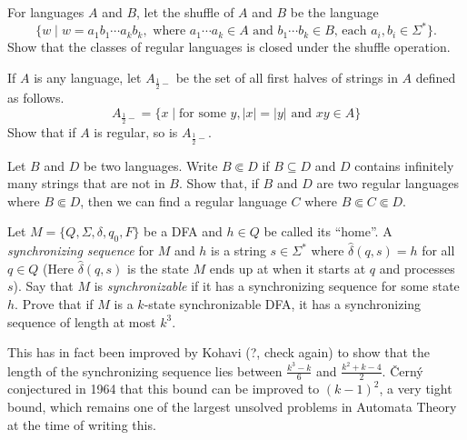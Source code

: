 \begin{exercise}
For languages $A$ and $B$, let the shuffle of $A$ and $B$ be the language
$$\{w\mid w=a_1b_1\cdots a_kb_k,\text{ where $a_1\cdots a_k\in A$ and $b_1\cdots b_k\in B$, each $a_i,b_i\in\Sigma^*$}\}.$$
Show that the classes of regular languages is closed under the shuffle operation.
\end{exercise}

\begin{exercise}
If $A$ is any language, let $A_{\frac 12-}$ be the set of all first halves of strings in $A$ defined as follows.
$$A_{\frac 12-}=\{x\mid \text{for some }y, |x|=|y|\text{ and }xy\in A\}$$
Show that if $A$ is regular, so is $A_{\frac 12-}$.
\end{exercise}

\begin{exercise}
Let $B$ and $D$ be two languages. Write $B\Subset D$ if $B\subseteq D$ and $D$ contains infinitely many strings that are not in $B$. Show that, if $B$ and $D$ are two regular languages where $B\Subset D$, then we can find a regular language $C$ where $B\Subset C\Subset D$.
\end{exercise}

\begin{exercise}
Let $M=\{Q,\Sigma,\delta,q_0,F\}$ be a DFA and $h\in Q$ be called its ``home''. A \textit{synchronizing sequence} for $M$ and $h$ is a string $s\in\Sigma^*$ where $\hat\delta(q,s)=h$ for all $q\in Q$ (Here $\hat\delta(q,s)$ is the state $M$ ends up at when it starts at $q$ and processes $s$). Say that $M$ is \textit{synchronizable} if it has a synchronizing sequence for some state $h$. Prove that if $M$ is a $k$-state synchronizable DFA, it has a synchronizing sequence of length at most $k^3$.

This has in fact been improved by Kohavi (?, check again) to show that the length of the synchronizing sequence lies between $\frac{k^3-k}{6}$ and $\frac{k^2+k-4}{2}$. \v{C}ern\'{y} conjectured in 1964 that this bound can be improved to $(k-1)^2$, a very tight bound, which remains one of the largest unsolved problems in Automata Theory at the time of writing this.
\end{exercise}
\clearpage